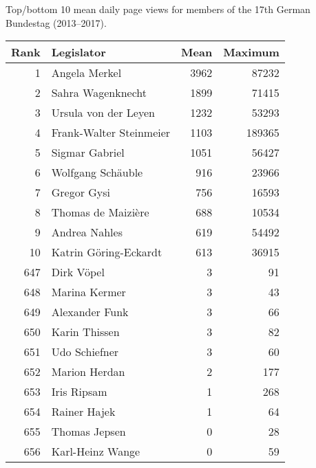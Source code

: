 \centering
\caption{Top/bottom 10 mean daily page views for members of the 17th German Bundestag (2013--2017).\label{tab:pageviewstopdeu}} 
\begingroup\scriptsize
\begin{tabular}{rlrr}
  \toprule
Rank & Legislator & Mean & Maximum \\ 
  \midrule
1 & Angela Merkel & 3962 & 87232 \\ 
  2 & Sahra Wagenknecht & 1899 & 71415 \\ 
  3 & Ursula von der Leyen & 1232 & 53293 \\ 
  4 & Frank-Walter Steinmeier & 1103 & 189365 \\ 
  5 & Sigmar Gabriel & 1051 & 56427 \\ 
   \midrule
6 & Wolfgang Schäuble & 916 & 23966 \\ 
  7 & Gregor Gysi & 756 & 16593 \\ 
  8 & Thomas de Maizière & 688 & 10534 \\ 
  9 & Andrea Nahles & 619 & 54492 \\ 
  10 & Katrin Göring-Eckardt & 613 & 36915 \\ 
   \midrule
647 & Dirk Vöpel & 3 & 91 \\ 
  648 & Marina Kermer & 3 & 43 \\ 
  649 & Alexander Funk & 3 & 66 \\ 
  650 & Karin Thissen & 3 & 82 \\ 
  651 & Udo Schiefner & 3 & 60 \\ 
   \midrule
652 & Marion Herdan & 2 & 177 \\ 
  653 & Iris Ripsam & 1 & 268 \\ 
  654 & Rainer Hajek & 1 & 64 \\ 
  655 & Thomas Jepsen & 0 & 28 \\ 
  656 & Karl-Heinz Wange & 0 & 59 \\ 
   \bottomrule
\end{tabular}
\endgroup

